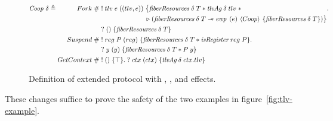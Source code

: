 \begin{figure}[ht]
  \begin{equation*}
    \protod{} \triangleq \begin{aligned}[t]
      Fork\;       & \#\; \begin{aligned}[t]
                             & !\; tlv\; e\; ((tlv, e))\; \begin{aligned}[t]
                                         & \big\{ \gsFiberResources{}\; \delta\; T \ast \gsTLVAg{}\; \delta\; tlv\; \ast                              \\
                                         & \later\; (\gsFiberResources{}\; \delta\; T \wand{} \ewp{e}{Coop}{\gsFiberResources{}\; \delta\; T}) \big\}
                                      \end{aligned} . \\
                             & ?\; ()\; \{ \gsFiberResources{}\; \delta\; T \}
                          \end{aligned}                                 \\
      Suspend\;    & \#\; \begin{aligned}[t]
                             & !\; reg\; P\; (reg)\; \{\gsFiberResources{}\; \delta\; T \ast \gsIsReg{}\; reg\; P\}. \\
                             & ?\; y\; (y)\; \{ \gsFiberResources{}\; \delta\; T \ast P\; y \}
                          \end{aligned} \\
      GetContext\; & \#\; !\; ()\; \{\top\}.\; ?\; ctx\; (ctx)\; \{ \gsTLVAg{}\; \delta\; ctx.tlv \}
    \end{aligned}
  \end{equation*}
  \caption{Definition of extended \protod{} protocol with \efork{}, \esuspend{}, and \egetctx{} effects.}
  \label{fig:coop-protocol-ext}
\end{figure}

These changes suffice to prove the safety of the two examples in figure~\ref{fig:tlv-example}.

